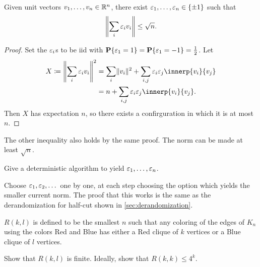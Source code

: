 \begin{theorem}
    Given unit vectors $v_1, \dots, v_n \in \mathbb{R}^n$, there exist
    $\varepsilon_1, \dots, \varepsilon_n \in \{\pm 1\}$ such that \[
        \norm*{\sum_i \eps_i v_i} \le \sqrt n.
    \]
\end{theorem}
\begin{proof}
    Set the $\varepsilon_i$s to be iid with
    $\operatorname{\mathbf P}\{\varepsilon_1 = 1\} = \operatorname{\mathbf P}\{\varepsilon_1 = -1\} = \frac12$.
    Let \begin{align*}
        X \coloneq \norm*{\sum_i \eps_i v_i}^2
            &= \sum_i \norm{v_i}^2 + \sum_{i,j} \eps_i \eps_j \innerp{v_i}{v_j} \\
            &= n + \sum_{i,j} \eps_i \eps_j \innerp{v_i}{v_j}.
    \end{align*}
    Then $X$ has expectation $n$, so there exists a confirguration in which
    it is at most $n$.
\end{proof}
The other inequality also holds by the same proof.
The norm can be made at least $\sqrt n$.

\begin{exercise}
    Give a deterministic algorithm to yield $\varepsilon_1, \dots, \varepsilon_n$.
\end{exercise}
\begin{solution}
    Choose $\varepsilon_1, \varepsilon_2, \dots$ one by one, at each step choosing the
    option which yields the smaller current norm.
    The proof that this works is the same as the derandomization for
    half-cut shown in \cref{sec:derandomization}.
\end{solution}

\begin{definition} \label{def:ramsey-numbers}
    $R(k, l)$ is defined to be the smallest $n$ such that any coloring of
    the edges of $K_n$ using the colors Red and Blue has either a Red clique
    of $k$ vertices or a Blue clique of $l$ vertices.
\end{definition}
\begin{exercise}
    Show that $R(k, l)$ is finite.
    Ideally, show that $R(k, k) \le 4^k$.
\end{exercise}
%

